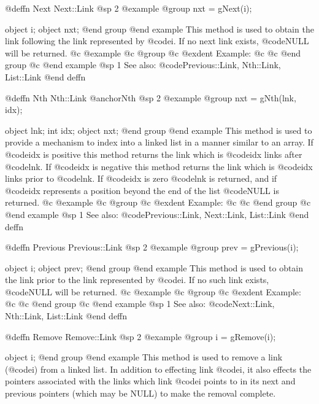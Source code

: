 @deffn {Next} Next::Link
@sp 2
@example
@group
nxt = gNext(i);

object  i;
object  nxt;
@end group
@end example
This method is used to obtain the link following the link represented by
@code{i}.   If no next link exists, @code{NULL} will be returned.
@c @example
@c @group
@c @exdent Example:
@c 
@c @end group
@c @end example
@sp 1
See also:  @code{Previous::Link, Nth::Link, List::Link}
@end deffn




















@deffn {Nth} Nth::Link
@anchor{Nth}
@sp 2
@example
@group
nxt = gNth(lnk, idx);

object  lnk;
int     idx;
object  nxt;
@end group
@end example
This method is used to provide a mechanism to index into a linked list
in a manner similar to an array.  If @code{idx} is positive this method
returns the link which is @code{idx} links after @code{lnk}.  If @code{idx}
is negative this method returns the link which is @code{idx} links prior to
@code{lnk}.  If @code{idx} is zero @code{lnk} is returned, and if @code{idx}
represents a position beyond the end of the list @code{NULL} is returned.
@c @example
@c @group
@c @exdent Example:
@c 
@c @end group
@c @end example
@sp 1
See also:  @code{Previous::Link, Next::Link, List::Link}
@end deffn










@deffn {Previous} Previous::Link
@sp 2
@example
@group
prev = gPrevious(i);

object  i;
object  prev;
@end group
@end example
This method is used to obtain the link prior to the link represented by
@code{i}.  If no such link exists, @code{NULL} will be returned.
@c @example
@c @group
@c @exdent Example:
@c 
@c @end group
@c @end example
@sp 1
See also:  @code{Next::Link, Nth::Link, List::Link}
@end deffn







@deffn {Remove} Remove::Link
@sp 2
@example
@group
i = gRemove(i);

object  i;
@end group
@end example
This method is used to remove a link (@code{i}) from a linked list.  In
addition to effecting link @code{i}, it also effects the pointers
associated with the links which link @code{i} points to in its next and
previous pointers (which may be NULL) to make the removal complete.

